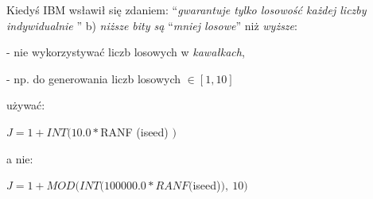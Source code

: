     \begin{frame}
	Kiedyś IBM wsławił się zdaniem: ``{\it gwarantuje tylko losowość każdej liczby indywidualnie }''
    \newline
    \newline
	b) {\it niższe bity są} ``{\it mniej losowe}'' niż {\it wyższe}:

    - nie wykorzystywać liczb losowych w {\it kawałkach},

	- np. do generowania liczb losowych $\in[1, 10 ]$

	używać:

	$J=1+INT(10.0*$RANF (iseed) $)$

	a nie:

	$J=1+MOD(INT(100000.0*RANF($iseed)$),\ 10)$
    \end{frame}
